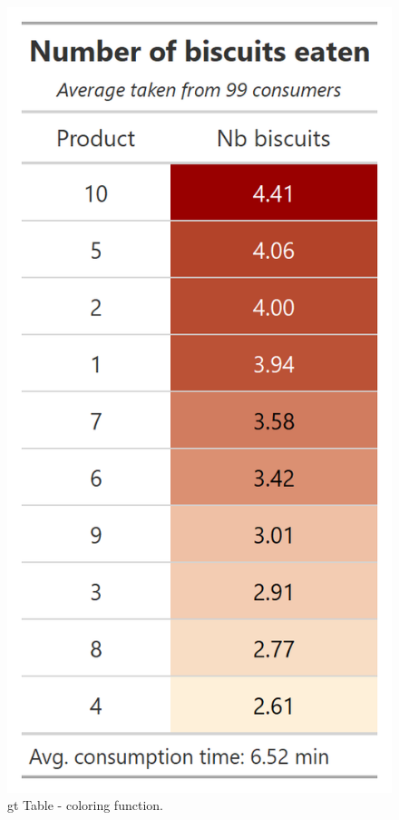 \documentclass[
]{krantz}
\begin{document}
\begin{figure}

{\centering \includegraphics[width=1\linewidth]{images/gt_table_2} 

}

\caption{gt Table - coloring function.}\label{fig:gttabledesigned}
\end{figure}
\end{document}
